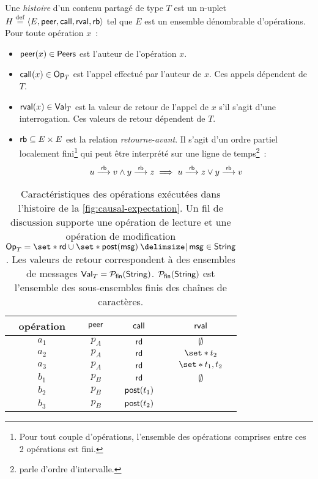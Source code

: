 \begin{definition}\label{def:history}
Une \emph{histoire} d'un contenu partagé de type $T$ est un n-uplet $H \defeq \tuple*{E, \trm{peer}, \trm{call}, \trm{rval}, \trm{rb}}$ tel que $E$ est un ensemble dénombrable d'opérations.
Pour toute opération $x$~:
\begin{itemize}
\item $\trm{peer}(x) \in \trm{Peers}$ est l'auteur de l'opération $x$.
\item $\trm{call}(x) \in \trm{Op}_T$ est l'appel effectué par l'auteur de $x$.
Ces appels dépendent de $T$.
\item $\trm{rval}(x) \in \trm{Val}_T$ est la valeur de retour de l'appel de $x$ s'il s'agit d'une interrogation.
Ces valeurs de retour dépendent de $T$.
\end{itemize}
\begin{itemize}[leftmargin=*]
\item[] $\trm{rb} \subseteq E \times E$ est la relation \emph{retourne-avant}.
Il s'agit d'un ordre partiel localement fini\footnote{Pour tout couple d'opérations, l'ensemble des opérations comprises entre ces 2 opérations est fini.} qui peut être interprété sur une ligne de temps\footnote{\textcite{greenough_1976_semiorder} parle d'ordre d'intervalle.}~:
\begin{equation*}
    u \rb v \land y \rb z \implies u \rb z \lor y \rb v
\end{equation*}
\end{itemize}
\end{definition}

\begin{table}[ht]
    \centering
    \begin{tabular}{cccc}
        opération & $\trm{peer}$ & $\trm{call}$ & $\trm{rval}$ \\
        \toprule
        $a_1$ & $p_A$ & $\trm{rd}$ & $\emptyset$ \\
        $a_2$ & $p_A$ & $\trm{rd}$ & $\set*{t_2}$ \\
        $a_3$ & $p_A$ & $\trm{rd}$ & $\set*{t_1, t_2}$ \\
        $b_1$ & $p_B$ & $\trm{rd}$ & $\emptyset$ \\
        $b_2$ & $p_B$ & $\trm{post}(t_1)$ & \\
        $b_3$ & $p_B$ & $\trm{post}(t_2)$ & \\
    \end{tabular}
    \caption[Caractéristiques des opérations exécutées dans l'histoire de la \autoref{fig:causal-expectation}]{Caractéristiques des opérations exécutées dans l'histoire de la \autoref{fig:causal-expectation}.
    Un fil de discussion supporte une opération de lecture et une opération de modification $\trm{Op}_T = \set*{\trm{rd}} \cup \set*{\trm{post}(\trm{msg}) \given \trm{msg} \in \trm{String}}$.
    Les valeurs de retour correspondent à des ensembles de messages $\trm{Val}_T = \powerfset{\trm{String}}$. $\powerfset{\trm{String}}$ est l'ensemble des sous-ensembles finis des chaînes de caractères.}\label{tab:op-attributes}
\end{table}

